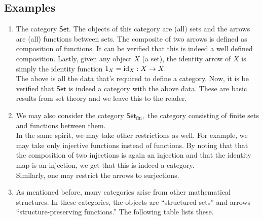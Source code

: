 \subsection{Examples}
\begin{enumerate} 
	\item The category $\mathsf{Set}.$ The objects of this category are (all) sets and the arrows are (all) functions between sets. The composite of two arrows is defined as composition of functions. It can be verified that this is indeed a well defined composition. Lastly, given any object $X$ (a set), the identity arrow of $X$ is simply the identity function $1_X = \operatorname{id}_X:X\to X.$\\
	The above is all the data that's required to define a category. Now, it is be verified that $\mathsf{Set}$ is indeed a category with the above data. These are basic results from set theory and we leave this to the reader.
	\item We may also consider the category $\mathsf{Set}_{\text{fin}},$ the category consisting of finite sets and functions between them.\\
	In the same spirit, we may take other restrictions as well. For example, we may take only injective functions instead of functions. By noting that that the composition of two injections is again an injection and that the identity map is an injection, we get that this is indeed a category.\\
	Similarly, one may restrict the arrows to surjections.
	\item As mentioned before, many categories arise from other mathematical structures. In these categories, the objects are ``structured sets'' and arrows ``structure-preserving functions.'' The following table lists these.


\end{enumerate}
